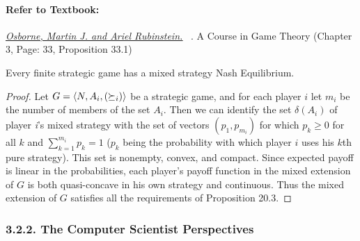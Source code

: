 \documentclass[runningheads]{llncs}
\begin{document}
\paragraph{Refer to Textbook:} 
\href{https://www.sciencedirect.com/science/article/pii/S0899825699907236}{\textit{\underline{Osborne, Martin J. and Ariel Rubinstein.}}}~
\citeyear{osborne1994course}. A Course in Game Theory (Chapter 3, Page: 33, Proposition 33.1)
\begin{proposition}
Every finite strategic game has a mixed strategy Nash Equilibrium.
\end{proposition}
\begin{proof}
Let $G=\langle\mathnormal{N}, \mathnormal{A_{i}},(\succeq_{i})\rangle$ be a strategic game, and for each player $i$ let $m_{i}$ be the number of members of the set $A_{i}$. Then we can identify the set $\delta(A_{i})$ of player \textit{i}'s mixed strategy with the set of vectors $(p_{1},p_{m_{i}})$ for which $p_{k} \geq 0 $ for all $k$ and $\sum_{k=1}^{m_i}p_{k}=1$ ($p_{k}$ being the probability with which player $i$ uses his $k$th pure strategy). This set is nonempty, convex, and compact. Since expected payoff is linear in the probabilities, each player's payoff function in the mixed extension of $G$ is both quasi-concave in his own strategy and continuous. Thus the mixed extension of $G$ satisfies all the requirements of Proposition 20.3.
 \end{proof}


\subsubsection{3.2.2. The Computer Scientist Perspectives}
\end{document}
